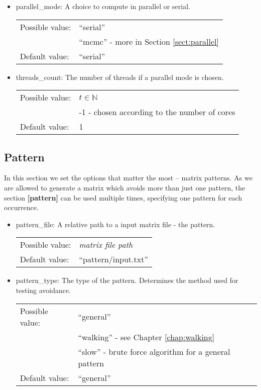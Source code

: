\begin{itemize}
\item parallel\_mode: A choice to compute in parallel or serial.

\begin{tabular}{ll}
Possible value: & ``serial'' \\
& ``mcmc'' - more in Section \ref{sect:parallel} \\
Default value: & ``serial''
\end{tabular}

\item threads\_count: The number of threads if a parallel mode is chosen.

\begin{tabular}{ll}
Possible value: & $t\in\mathbb{N}$ \\
& -1 - chosen according to the number of cores \\
Default value: & 1
\end{tabular}
\end{itemize}

\subsection{Pattern}
In this section we set the options that matter the most -- matrix patterns. As we are allowed to generate a matrix which avoids more than just one pattern, the section \textbf{[pattern]} can be used multiple times, specifying one pattern for each occurrence.
\begin{itemize}
\item pattern\_file: A relative path to a input matrix file - the pattern.

\begin{tabular}{ll}
Possible value: & \textit{matrix file path} \\
Default value: & ``pattern/input.txt''
\end{tabular}

\item pattern\_type: The type of the pattern. Determines the method used for testing avoidance.

\begin{tabular}{ll}
Possible value: & ``general'' \\
& ``walking'' - see Chapter \ref{chap:walking} \\
& ``slow'' - brute force algorithm for a general pattern \\
Default value: & ``general''
\end{tabular}
\end{itemize}

